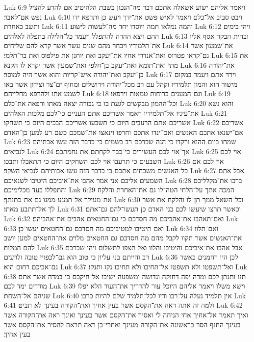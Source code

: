 Luk 6:9  ויאמר אליהם ישוע אשאלה אתכם דבר מה־הנכון בשבת הלהיטיב אם להרע להציל נפש אם־לאבד׃
Luk 6:10  ויבט סביב אל־כלם ויאמר לאיש פשט את־ידך ויעש כן ותרפא ידו ותשב כאחרת׃
Luk 6:11  והמה נמלאו חמה ויוסדו יחד מה־לעשות לישוע׃
Luk 6:12  ויהי בימים ההם ויצא ההרה להתפלל ויעמד כל־הלילה בתפלה לאלהים׃
Luk 6:13  ובהית הבקר אסף אליו את־תלמידיו ויבחר מהם שנים עשר אשר קרא להם שליחים׃
Luk 6:14  את־שמעון אשר גם־קראו פטרוס ואת־אנדרי אחיו את־יעקב ואת יוחנן את פילפוס ואת בר־תלמי׃
Luk 6:15  את מתי ואת־תומא ואת־יעקב בן־חלפי ואת־שמעון אשר יקרא לו הקנא׃
Luk 6:16  את־יהודה בן־יעקב ואת־יהודה איש־קריות והוא אשר היה למוסר׃
Luk 6:17  וירד אתם ויעמד במקום מישור הוא והמון תלמידיו וקהל עם רב מכל־יהודה וירושלים ומחוף ים־צר וצידון אשר באו לשמע אתו ולהרפא מחלייהם׃
Luk 6:18  וגם־המענים ברוחות טמאות וירפאו׃
Luk 6:19  וכל־ההמון מבקשים לגעת בו כי גבורה יצאה מאתו ורפאה את־כלם׃
Luk 6:20  והוא נשא את־עיניו אל־תלמידיו ויאמר אשריכם אתם העניים כי־לכם מלכות האלהים׃
Luk 6:21  אשריכם אתם הרעבים היום כי תשבעו אשריכם הבכים היום כי תשחקו׃
Luk 6:22  אשריכם אם־ישנאו אתכם האנשים ואם־ינדו אתכם וחרפו וינאצו את־שמכם כשם רע למען בן־האדם׃
Luk 6:23  שמחו ביום ההוא ורקדו כי הנה שכרכם רב בשמים כי־כדבר הזה עשו אבתיהם לנביאים׃
Luk 6:24  אך־אוי לכם העשירים כי־כבר לקחתם את נחמתכם׃
Luk 6:25  אוי לכם השבעים כי תרעבו אוי לכם השחקים היום כי תתאבלו ותבכו׃
Luk 6:26  אוי לכם אם כל־האנשים משבחים אתכם כי כדבר הזה עשו אבותיהם לנביאי השקר׃
Luk 6:27  אבל אתם השמעים אליכם אני אמר אהבו את־איביכם היטיבו לשנאיכם׃
Luk 6:28  ברכו את־מקלליכם והתפללו בעד מכלימיכם׃
Luk 6:29  המכה אתך על־הלחי הטה־לו גם את־האחרת והלקח את־מעילך אל־תמנע ממנו גם את־כתנתך׃
Luk 6:30  וכל־השאל ממך תן־לו והלקח את אשר לך אל־תתבע מאתו׃
Luk 6:31  וכאשר תרצו שיעשו לכם בני האדם כן תעשו־להם גם־אתם׃
Luk 6:32  ואם־תאהבו את־אהביכם מה חסדכם כי גם־החטאים אהבים את־אהביהם׃
Luk 6:33  ואם תיטיבו למטיביכם מה חסדכם גם־החטאים יעשו־כן׃
Luk 6:34  ואם־תלוו את־האנשים אשר תקוו לקבל מהם מה חסדכם גם החטאים מלוים את־החטאים למען יושב להם המלוה׃
Luk 6:35  אבל אהבו את־איביכם והיטיבו והלוו ואל תצפו לתשלום ויהי שכרכם רב והייתם בני עליון כי טוב הוא גם־לכפויי טובה ולרעים׃
Luk 6:36  לכן היו רחמנים כאשר גם־אביכם רחום הוא׃
Luk 6:37  ואל־תשפטו ולא תשפטו אל־תחיבו ולא תחיבו נקו ותנקו׃
Luk 6:38  תנו ותנתן לכם ומדה יפה דחוקה וגדושה ומשפעה ישיבו אל־חיקכם כי במדה אשר אתם מודדים ימד לכם׃
Luk 6:39  וישא משלו ויאמר אליהם היוכל עור להדריך את־העור הלא יפלו שניהם אל־השחת׃
Luk 6:40  אין תלמיד נעלה על־רבו ודיו לכל־תלמיד שלם להיות כרבו׃
Luk 6:41  ולמה זה אתה ראה את־הקסם אשר בעין אחיך ואת־הקורה בעינך לא תביט׃
Luk 6:42  ואיך תאמר אל־אחיך אחי הניחה לי ואסיר את־הקסם אשר בעינך ואינך ראה את־הקורה אשר בעינך החנף הסר בראשונה את־הקורה מעינך ואחרי־כן ראה תראה להסיר את־הקסם אשר בעין אחיך׃
